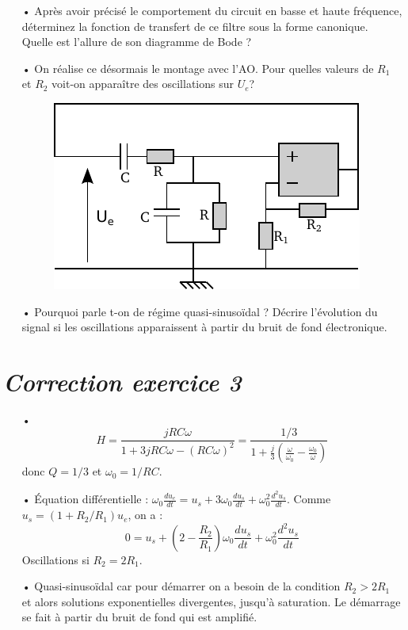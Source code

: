 \documentclass{report}
\begin{document}
\begin{itemize}
	\item[•] Après avoir précisé le comportement du circuit en basse et haute fréquence, déterminez la fonction de transfert de ce filtre sous la forme canonique. Quelle est l'allure de son diagramme de Bode ?
	\item[•] On réalise ce désormais le montage avec l'AO. Pour quelles valeurs de $R_1$ et $R_2$ voit-on apparaître des oscillations sur $U_{e}$?
\begin{figure}[!h]
\centering
\includegraphics[width=0.6\linewidth]{circuit_4.pdf}
\end{figure}

	\item[•] Pourquoi parle t-on de régime quasi-sinusoïdal ? Décrire l'évolution du signal si les oscillations apparaissent à partir du bruit de fond électronique.
\end{itemize}

\newpage

\section*{\textit{Correction exercice 3}}

\begin{itemize}
	\item[•]
	\begin{equation}
		H=\frac{jRC\omega}{1+3jRC\omega-(RC\omega)^2}=\frac{1/3}{1+\frac{j}{3}\left( \frac{\omega}{\omega_0}-\frac{\omega_0}{\omega}\right) }
	\end{equation}
	donc $Q=1/3$ et $\omega_0=1/RC$.
	\item[•] Équation différentielle : $\omega_0\frac{du_e}{dt}=u_s+3\omega_0\frac{du_s}{dt}+\omega_0^2\frac{d^2u_s}{dt}$. Comme $u_s = (1+R_2/R_1)u_e$, on a :
	\begin{equation}
	0=u_s+\left( 2-\frac{R_2}{R_1}\right) \omega_0\frac{du_s}{dt}+\omega_0^2\frac{d^2u_s}{dt}
	\end{equation}
	Oscillations si $R_2=2R_1$.
	\item[•] Quasi-sinusoïdal car pour démarrer on a besoin de la condition $R_2>2R_1$ et alors solutions exponentielles divergentes, jusqu'à saturation. Le démarrage se fait à partir du bruit de fond qui est amplifié. 
\end{itemize}
\end{document}
